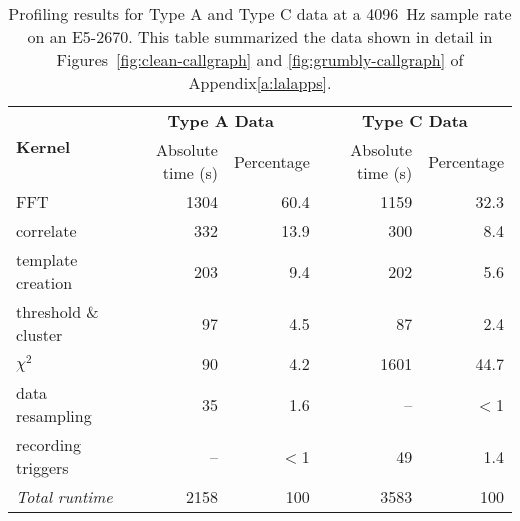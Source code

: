 \begin{table}
  \centering
  \begin{tabular}{|l|r|r|r|r|}\hline
   \multirow{2}{*}{\textbf{Kernel}} & \multicolumn{2}{c|}{\textbf{Type A Data}}
    & \multicolumn{2}{|c|}{\textbf{Type C Data}} \\ \cline{2-5}
    & Absolute time (s) & Percentage & Absolute time (s) & Percentage \\ \hline
    FFT & 1304 & 60.4 & 1159 & 32.3 \\ \hline
    correlate & 332 & 13.9 & 300 & 8.4 \\ \hline
    template creation & 203 & 9.4 & 202 & 5.6 \\ \hline
    threshold \& cluster & 97 & 4.5 & 87 & 2.4 \\ \hline
    $\chi^2$ & 90 & 4.2 & 1601 & 44.7 \\ \hline
    data resampling & 35 & 1.6 & -- & $<$1 \\ \hline
    recording triggers & -- & $<$1 & 49 & 1.4 \\ \hline \hline
    \emph{Total runtime} & 2158 & 100 & 3583 & 100 \\ \hline
  \end{tabular}
  \caption{Profiling results for Type A and Type C data at a 4096~Hz sample
    rate on an E5-2670. This table summarized the data shown in detail in
Figures~\ref{fig:clean-callgraph} and \ref{fig:grumbly-callgraph} of Appendix\ref{a:lalapps}.}
  \label{tab:callgraph}
\end{table}

